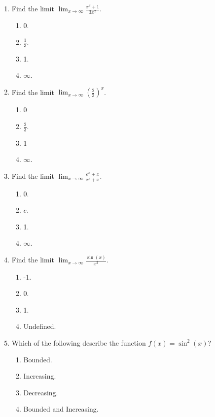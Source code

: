 \documentclass{article}
\begin{document}
\begin{enumerate}


  \item Find the limit $\displaystyle \lim_{x\to\infty} \frac{x^2+1}{3x^2}$.
  \begin{enumerate}
    \item 0.
    \item $\frac{1}{3}$. %
    \item 1.
    \item $\infty$.
  \end{enumerate}
  
  \item Find the limit $\displaystyle \lim_{x\to\infty} \left(\frac{2}{3}\right)^x$.
  \begin{enumerate}
    \item 0 %
    \item $\frac{2}{3}$. 
    \item 1
    \item $\infty$.
  \end{enumerate}
  
  
  \item Find the limit $\displaystyle \lim_{x\to\infty} \frac{e^x+x}{x^e+x}$.
  \begin{enumerate}
    \item 0. 
    \item $e$. 
    \item 1.
    \item $\infty$. %
  \end{enumerate}
  
  \item Find the limit $\displaystyle \lim_{x\to\infty} \frac{\sin(x)}{x^2}$.
  \begin{enumerate}
    \item -1. 
    \item 0. %
    \item 1.
    \item Undefined. 
  \end{enumerate}
  
  \item Which of the following describe the function $f(x)=\sin^2(x)$?
  \begin{enumerate}
    \item Bounded. %
    \item Increasing. 
    \item Decreasing.
    \item Bounded and Increasing. 
  \end{enumerate}
  

\end{enumerate}
\end{document}
